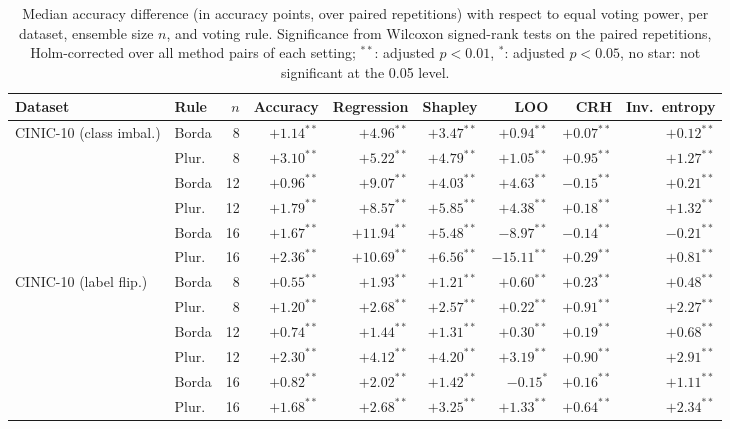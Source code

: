 \begin{table}[tbp]
  \centering
  \caption{Median accuracy difference (in accuracy points, over paired repetitions) with respect to equal voting power, per dataset, ensemble size $n$, and voting rule. Significance from Wilcoxon signed-rank tests on the paired repetitions, Holm-corrected over all method pairs of each setting; $^{**}$: adjusted $p<0.01$, $^{*}$: adjusted $p<0.05$, no star: not significant at the 0.05 level.}
  \label{tab:significance}
  \scriptsize\setlength{\tabcolsep}{3pt}
  \begin{tabular}{llrrrrrrr}
    \toprule
    Dataset & Rule & $n$ & Accuracy & Regression & Shapley & LOO & CRH & Inv.\ entropy \\
    \midrule
    CINIC-10 (class imbal.) & Borda & 8 & $+1.14^{**}$ & $+4.96^{**}$ & $+3.47^{**}$ & $+0.94^{**}$ & $+0.07^{**}$ & $+0.12^{**}$ \\
     & Plur. & 8 & $+3.10^{**}$ & $+5.22^{**}$ & $+4.79^{**}$ & $+1.05^{**}$ & $+0.95^{**}$ & $+1.27^{**}$ \\
     & Borda & 12 & $+0.96^{**}$ & $+9.07^{**}$ & $+4.03^{**}$ & $+4.63^{**}$ & $-0.15^{**}$ & $+0.21^{**}$ \\
     & Plur. & 12 & $+1.79^{**}$ & $+8.57^{**}$ & $+5.85^{**}$ & $+4.38^{**}$ & $+0.18^{**}$ & $+1.32^{**}$ \\
     & Borda & 16 & $+1.67^{**}$ & $+11.94^{**}$ & $+5.48^{**}$ & $-8.97^{**}$ & $-0.14^{**}$ & $-0.21^{**}$ \\
     & Plur. & 16 & $+2.36^{**}$ & $+10.69^{**}$ & $+6.56^{**}$ & $-15.11^{**}$ & $+0.29^{**}$ & $+0.81^{**}$ \\
    \midrule
    CINIC-10 (label flip.) & Borda & 8 & $+0.55^{**}$ & $+1.93^{**}$ & $+1.21^{**}$ & $+0.60^{**}$ & $+0.23^{**}$ & $+0.48^{**}$ \\
     & Plur. & 8 & $+1.20^{**}$ & $+2.68^{**}$ & $+2.57^{**}$ & $+0.22^{**}$ & $+0.91^{**}$ & $+2.27^{**}$ \\
     & Borda & 12 & $+0.74^{**}$ & $+1.44^{**}$ & $+1.31^{**}$ & $+0.30^{**}$ & $+0.19^{**}$ & $+0.68^{**}$ \\
     & Plur. & 12 & $+2.30^{**}$ & $+4.12^{**}$ & $+4.20^{**}$ & $+3.19^{**}$ & $+0.90^{**}$ & $+2.91^{**}$ \\
     & Borda & 16 & $+0.82^{**}$ & $+2.02^{**}$ & $+1.42^{**}$ & $-0.15^{*}$ & $+0.16^{**}$ & $+1.11^{**}$ \\
     & Plur. & 16 & $+1.68^{**}$ & $+2.68^{**}$ & $+3.25^{**}$ & $+1.33^{**}$ & $+0.64^{**}$ & $+2.34^{**}$ \\

\end{tabular}
\end{table}
